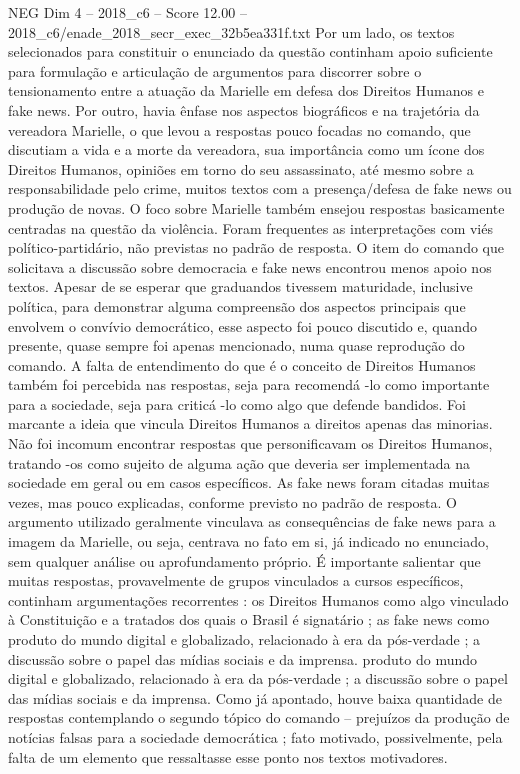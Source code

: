 \begin{textsample}{NEG Dim 4 – 2018\_c6 – Score 12.00 – 2018\_c6/enade\_2018\_secr\_exec\_32b5ea331f.txt}
Por um lado, os textos selecionados para constituir o enunciado da questão continham apoio suficiente para formulação e articulação de argumentos para discorrer sobre o tensionamento entre a atuação da Marielle em defesa dos Direitos Humanos e fake news.
Por outro, havia ênfase nos aspectos biográficos e na trajetória da vereadora Marielle, o que levou a respostas pouco focadas no comando, que discutiam a vida e a morte da vereadora, sua importância como um ícone dos Direitos Humanos, opiniões em torno do seu assassinato, até mesmo sobre a responsabilidade pelo crime, muitos textos com a presença/defesa de fake news ou produção de novas.
O foco sobre Marielle também ensejou respostas basicamente centradas na questão da violência.
Foram frequentes as interpretações com viés político-partidário, não previstas no padrão de resposta.
O item do comando que solicitava a discussão sobre democracia e fake news encontrou menos apoio nos textos.
Apesar de se esperar que graduandos tivessem maturidade, inclusive política, para demonstrar alguma compreensão dos aspectos principais que envolvem o convívio democrático, esse aspecto foi pouco discutido e, quando presente, quase sempre foi apenas mencionado, numa quase reprodução do comando.
A falta de entendimento do que é o conceito de Direitos Humanos também foi percebida nas respostas, seja para recomendá -lo como importante para a sociedade, seja para criticá -lo como algo que defende bandidos.
Foi marcante a ideia que vincula Direitos Humanos a direitos apenas das minorias.
Não foi incomum encontrar respostas que personificavam os Direitos Humanos, tratando -os como sujeito de alguma ação que deveria ser implementada na sociedade em geral ou em casos específicos.
As fake news foram citadas muitas vezes, mas pouco explicadas, conforme previsto no padrão de resposta.
O argumento utilizado geralmente vinculava as consequências de fake news para a imagem da Marielle, ou seja, centrava no fato em si, já indicado no enunciado, sem qualquer análise ou aprofundamento próprio.
É importante salientar que muitas respostas, provavelmente de grupos vinculados a cursos específicos, continham argumentações recorrentes : os Direitos Humanos como algo vinculado à Constituição e a tratados dos quais o Brasil é signatário ; as fake news como produto do mundo digital e globalizado, relacionado à era da pós-verdade ; a discussão sobre o papel das mídias sociais e da imprensa. produto do mundo digital e globalizado, relacionado à era da pós-verdade ; a discussão sobre o papel das mídias sociais e da imprensa.
Como já apontado, houve baixa quantidade de respostas contemplando o segundo tópico do comando – prejuízos da produção de notícias falsas para a sociedade democrática ; fato motivado, possivelmente, pela falta de um elemento que ressaltasse esse ponto nos textos motivadores.

\end{textsample}
